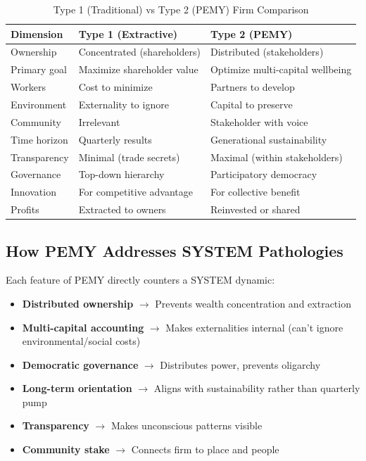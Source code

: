 \documentclass[11pt,a4paper]{article}
\theoremstyle{definition}
\theoremstyle{remark}
\begin{document}
\begin{table}[H]
\centering
\caption{Type 1 (Traditional) vs Type 2 (PEMY) Firm Comparison}
\begin{tabularx}{\textwidth}{lXX}
\toprule
\textbf{Dimension} & \textbf{Type 1 (Extractive)} & \textbf{Type 2 (PEMY)} \\
\midrule
Ownership & Concentrated (shareholders) & Distributed (stakeholders) \\
Primary goal & Maximize shareholder value & Optimize multi-capital wellbeing \\
Workers & Cost to minimize & Partners to develop \\
Environment & Externality to ignore & Capital to preserve \\
Community & Irrelevant & Stakeholder with voice \\
Time horizon & Quarterly results & Generational sustainability \\
Transparency & Minimal (trade secrets) & Maximal (within stakeholders) \\
Governance & Top-down hierarchy & Participatory democracy \\
Innovation & For competitive advantage & For collective benefit \\
Profits & Extracted to owners & Reinvested or shared \\
\bottomrule
\end{tabularx}
\label{tab:type_comparison}
\end{table}

\subsection{How PEMY Addresses SYSTEM Pathologies}

Each feature of PEMY directly counters a SYSTEM dynamic:

\begin{itemize}
    \item \textbf{Distributed ownership} $\to$ Prevents wealth concentration and extraction
    \item \textbf{Multi-capital accounting} $\to$ Makes externalities internal (can't ignore environmental/social costs)
    \item \textbf{Democratic governance} $\to$ Distributes power, prevents oligarchy
    \item \textbf{Long-term orientation} $\to$ Aligns with sustainability rather than quarterly pump
    \item \textbf{Transparency} $\to$ Makes unconscious patterns visible
    \item \textbf{Community stake} $\to$ Connects firm to place and people
\end{itemize}
\end{document}
